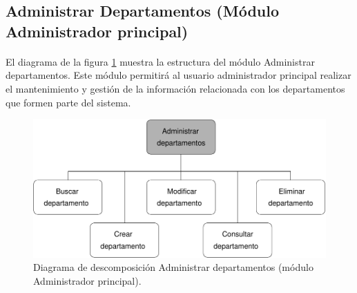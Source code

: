 \subsection{Administrar Departamentos (Módulo Administrador principal)}

  \paragraph{}El diagrama de la figura
  \ref{diagramaDescomposicionAdministrarDepartamentos} muestra la estructura del
  módulo Administrar departamentos. Este módulo permitirá al usuario
  administrador principal realizar el mantenimiento y gestión de la información
  relacionada con los departamentos que formen parte del sistema.


  \begin{figure}[!ht]
    \begin{center}
      \includegraphics[]{11.Disenyo_Arquitectonico/11.2.Diagramas_Descomposicion/11.2.2.Modulo_administrador_principal/AdministrarBBDD/AdministrarDepartamentos/Diagramas/administrar_departamentos.pdf}
      \caption{Diagrama de descomposición Administrar departamentos (módulo Administrador principal).}
      \label{diagramaDescomposicionAdministrarDepartamentos}
    \end{center}
  \end{figure}
